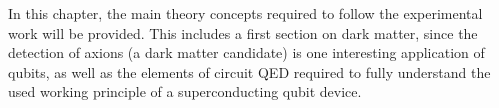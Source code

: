 
In this chapter, the main theory concepts required to follow the experimental work will be provided.
This includes a first section on dark matter, since the detection of axions (a dark matter candidate) is one interesting application of qubits, as well as the elements of circuit QED required to fully understand the used working principle of a superconducting qubit device.



